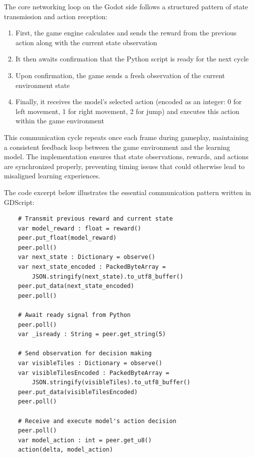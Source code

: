 The core networking loop on the Godot side follows a structured pattern of state transmission and action reception:

\begin{enumerate}
    \item First, the game engine calculates and sends the reward from the previous action along with the current state observation
    \item It then awaits confirmation that the Python script is ready for the next cycle
    \item Upon confirmation, the game sends a fresh observation of the current environment state
    \item Finally, it receives the model's selected action (encoded as an integer: 0 for left movement, 1 for right movement, 2 for jump) and executes this action within the game environment
\end{enumerate}

This communication cycle repeats once each frame during gameplay, maintaining a consistent feedback loop between the game environment and the learning model. 
The implementation ensures that state observations, rewards, and actions are synchronized properly, preventing timing issues that could otherwise lead to misaligned learning experiences.

The code excerpt below illustrates the essential communication pattern written in GDScript:

\singlespaced
\begin{verbatim}
    # Transmit previous reward and current state
    var model_reward : float = reward()
    peer.put_float(model_reward)
    peer.poll()
    var next_state : Dictionary = observe()
    var next_state_encoded : PackedByteArray = 
        JSON.stringify(next_state).to_utf8_buffer()
    peer.put_data(next_state_encoded)
    peer.poll()

    # Await ready signal from Python
    peer.poll()
    var _isready : String = peer.get_string(5)

    # Send observation for decision making
    var visibleTiles : Dictionary = observe()
    var visibleTilesEncoded : PackedByteArray = 
        JSON.stringify(visibleTiles).to_utf8_buffer()
    peer.put_data(visibleTilesEncoded)
    peer.poll()

    # Receive and execute model's action decision
    peer.poll()
    var model_action : int = peer.get_u8()
    action(delta, model_action)
\end{verbatim}
\doublespaced


